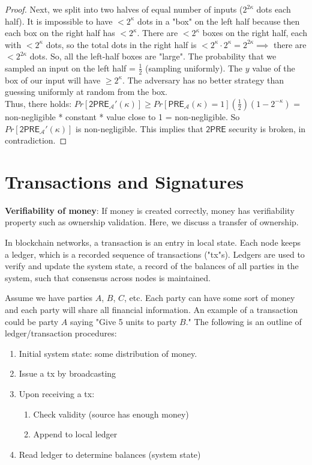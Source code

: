 \begin{proof}
Next, we split into two halves of equal number of inputs ($2^{2\kappa}$ dots each half). It is impossible to have $< 2^\kappa$ dots in a "box" on the left half because then each box on the right half has $<2^\kappa$. There are $<2^\kappa$ boxes on the right half, each with $<2^\kappa$ dots, so the total dots in the right half is $<2^\kappa \cdot 2^\kappa = 2^{2\kappa} \implies $ there are $<2^{2\kappa}$ dots.
So, all the left-half boxes are "large".
The probability that we sampled an input on the left half = $\frac{1}{2}$ (sampling uniformly). The $y$ value of the box of our input will have $\geq 2^\kappa$. The adversary has no better strategy than guessing uniformly at random from the box. \\
Thus, there holds: $Pr[\mathsf{2PRE}_\mathcal{A}'(\kappa)] \geq Pr[\mathsf{PRE}_\mathcal{A}(\kappa)=1](\frac{1}{2})(1-2^{-\kappa})$
= non-negligible * constant * value close to 1 = non-negligible. So $Pr[\mathsf{2PRE}_\mathcal{A}'(\kappa)]$ is non-negligible. This implies that $\mathsf{2PRE}$ security is broken, in contradiction.
\end{proof}

\section{Transactions and Signatures}
\textbf{Verifiability of money}: If money is created correctly, money has verifiability property such as ownership validation. Here, we discuss a transfer of ownership.

In blockchain networks, a transaction is an entry in local state. Each node keeps a ledger, which is a recorded sequence of transactions ("tx"s). Ledgers are used to verify and update the system state, a record of the balances of all parties in the system, such that consensus across nodes is maintained.

Assume we have parties $A$, $B$, $C$, etc. Each party can have some sort of money and each party will share all financial information. An example of a transaction could be party $A$ saying "Give 5 units to party $B$." The following is an outline of ledger/transaction procedures:
\begin{enumerate}
    \item
    Initial system state: some distribution of money.
    \item
    Issue a tx by broadcasting
    \item
    Upon receiving a tx:
    \begin{enumerate}
        \item
        Check validity (source has enough money)
        \item
        Append to local ledger
    \end{enumerate}
    \item
    Read ledger to determine balances (system state)
\end{enumerate}

